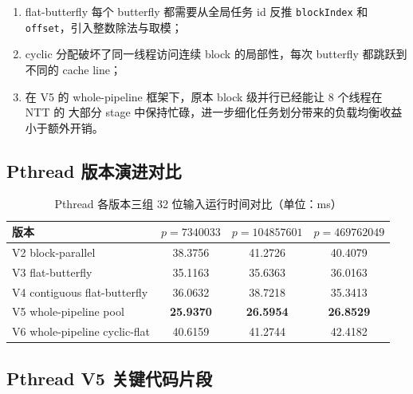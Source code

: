 \documentclass[UTF8,a4paper,10pt]{ctexart}
\begin{document}
\begin{enumerate}
  \item flat-butterfly 每个 butterfly 都需要从全局任务 id 反推 \texttt{blockIndex}
        和 \texttt{offset}，引入整数除法与取模；
  \item cyclic 分配破坏了同一线程访问连续 block 的局部性，每次 butterfly 都跳跃到
        不同的 cache line；
  \item 在 V5 的 whole-pipeline 框架下，原本 block 级并行已经能让 8 个线程在 NTT 的
        大部分 stage 中保持忙碌，进一步细化任务划分带来的负载均衡收益小于额外开销。
\end{enumerate}

\subsection{Pthread 版本演进对比}

\begin{table}[H]
  \centering
  \begin{tabular}{lccc}
  \toprule  
  \textbf{版本} & $p=7340033$ & $p=104857601$ & $p=469762049$ \\
  \midrule
  V2 block-parallel             & 38.3756          & 41.2726          & 40.4079          \\
  V3 flat-butterfly             & 35.1163          & 35.6363          & 36.0163          \\
  V4 contiguous flat-butterfly  & 36.0632          & 38.7218          & 35.3413          \\
  V5 whole-pipeline pool        & \textbf{25.9370} & \textbf{26.5954} & \textbf{26.8529} \\
  V6 whole-pipeline cyclic-flat & 40.6159          & 41.2744          & 42.4182          \\
  \bottomrule
  \end{tabular}
  \caption{Pthread 各版本三组 32 位输入运行时间对比（单位：ms）}
  \label{tab:pthread-versions}
\end{table}

\subsection{Pthread V5 关键代码片段}
\end{document}
